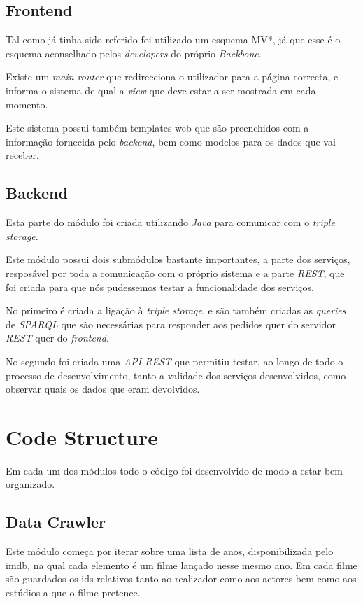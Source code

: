 \documentclass[a4paper]{article}
\begin{document}
\subsection{Frontend}
\indent \indent Tal como já tinha sido referido foi utilizado um esquema MV*, já que esse é o esquema aconselhado pelos \textit{developers} do próprio \textit{Backbone}.

Existe um \textit{main router} que redirecciona o utilizador para a página correcta, e informa o sistema de qual a \textit{view} que deve estar a ser mostrada em cada momento.

Este sistema possui também templates web que são preenchidos com a informação fornecida pelo \textit{backend}, bem como modelos para os dados que vai receber.

\subsection{Backend}
\indent \indent Esta parte do módulo foi criada utilizando \textit{Java} para comunicar com o \textit{triple storage}.

Este módulo possui dois submódulos bastante importantes, a parte dos serviços, resposável por toda a comunicação com o próprio sistema e a parte \textit{REST}, que foi criada para que nós pudessemos testar a funcionalidade dos serviços.

No primeiro é criada a ligação à \textit{triple storage}, e são também criadas as \textit{queries} de \textit{SPARQL} que são necessárias para responder aos pedidos quer do servidor \textit{REST} quer do \textit{frontend}.

No segundo foi criada uma \textit{API REST} que permitiu testar, ao longo de todo o processo de desenvolvimento, tanto a validade dos serviços desenvolvidos, como observar quais os dados que eram devolvidos.

\section{Code Structure}
\indent \indent Em cada um dos módulos todo o código foi desenvolvido de modo a estar bem organizado.

\subsection{Data Crawler}
\indent \indent Este módulo começa por iterar sobre uma lista de anos, disponibilizada pelo imdb, na qual cada elemento é um filme lançado nesse mesmo ano. Em cada filme são guardados os ids relativos tanto ao realizador como aos actores bem como aos estúdios a que o filme pretence.
\end{document}
